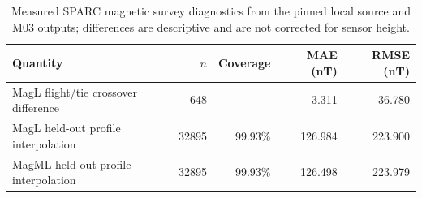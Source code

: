 \begin{table}[!t]
\centering
\caption{Measured SPARC magnetic survey diagnostics from the pinned local source and M03 outputs; differences are descriptive and are not corrected for sensor height.}
\label{tab:sparc-m03-measured}
\begin{tabular}{lrrrr}
\toprule
Quantity & $n$ & Coverage & MAE (nT) & RMSE (nT)\\
\midrule
MagL flight/tie crossover difference & 648 & -- & 3.311 & 36.780\\
MagL held-out profile interpolation & 32895 & 99.93\% & 126.984 & 223.900\\
MagML held-out profile interpolation & 32895 & 99.93\% & 126.498 & 223.979\\
\bottomrule
\end{tabular}
\end{table}
